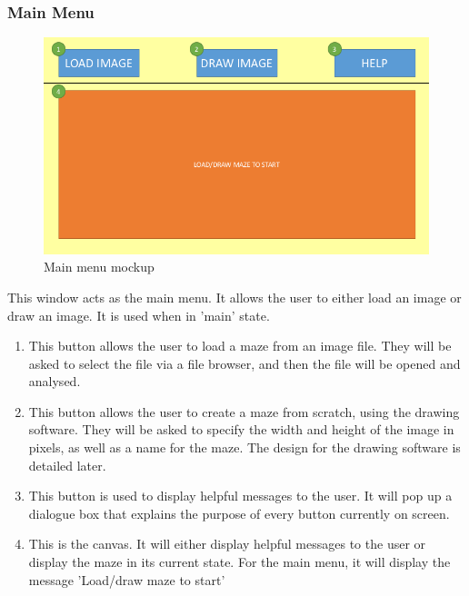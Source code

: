\documentclass[titlepage]{article}
\begin{document}
\subsubsection{Main Menu}
\begin{figure}[H]
  \centering
  \includegraphics[width=12cm]{Slide1.png}
  \caption{Main menu mockup}
  \label{fig:dijk}
\end{figure}
This window acts as the main menu. It allows the user to either load an image or draw an image. It is used when in 'main' state.
\begin{enumerate}
\item This button allows the user to load a maze from an image file. They will be asked to select the file via a file browser, and then the file will be opened and analysed.
\item This button allows the user to create a maze from scratch, using the drawing software. They will be asked to specify the width and height of the image in pixels, as well as a name for the maze. The design for the drawing software is detailed later.
\item This button is used to display helpful messages to the user. It will pop up a dialogue box that explains the purpose of every button currently on screen.
\item This is the canvas. It will either display helpful messages to the user or display the maze in its current state. For the main menu, it will display the message 'Load/draw maze to start'
\end{enumerate}
\end{document}
